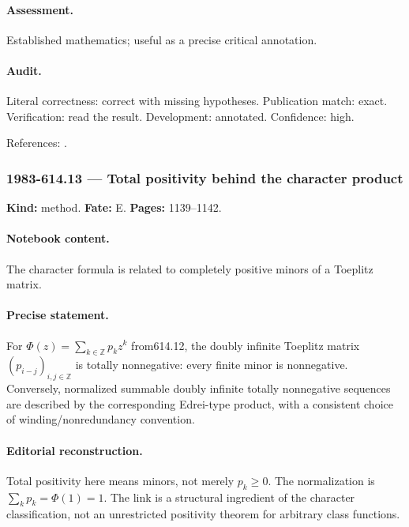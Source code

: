 \paragraph{Assessment.} Established mathematics; useful as a precise critical annotation.

\paragraph{Audit.} Literal correctness: correct with missing hypotheses. Publication match: exact. Verification: read the result. Development: annotated. Confidence: high.

\noindent References: \citep{vershikkerov1982unitary}.\par

\subsubsection{1983-614.13 --- Total positivity behind the character product}

\label{item:1983-614.13}

\noindent\textbf{Kind:} method. \textbf{Fate:} E. \textbf{Pages:} 1139--1142.\par

\paragraph{Notebook content.} The character formula is related to completely positive minors of a Toeplitz matrix.

\paragraph{Precise statement.} For $\Phi(z)=\sum_{k\in\mathbb Z}p_kz^k$ from614.12, the doubly infinite Toeplitz matrix $(p_{i-j})_{i,j\in\mathbb Z}$ is totally nonnegative: every finite minor is nonnegative. Conversely, normalized summable doubly infinite totally nonnegative sequences are described by the corresponding Edrei-type product, with a consistent choice of winding/nonredundancy convention.

\paragraph{Editorial reconstruction.} Total positivity here means minors, not merely $p_k\ge0$. The normalization is $\sum_kp_k=\Phi(1)=1$. The link is a structural ingredient of the character classification, not an unrestricted positivity theorem for arbitrary class functions.

